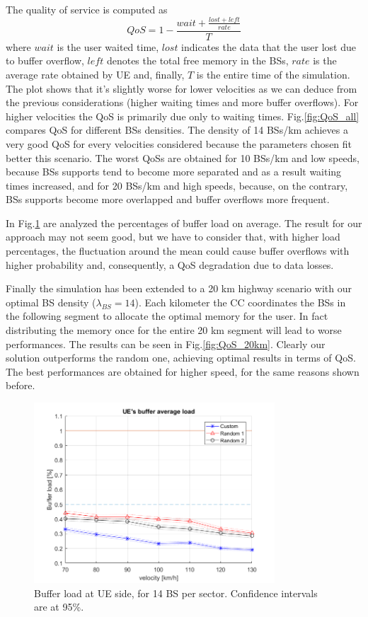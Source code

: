 \documentclass[conference,10pt]{IEEEtran}
\begin{document}
The quality of service is computed as
\begin{equation}
QoS = 1-\frac{wait+\frac{lost+left}{rate}}{T}
\end{equation} 
where $wait$ is the user waited time, $lost$ indicates the data that the user lost due to buffer overflow, $left$ denotes the total free memory in the BSs, $rate$ is the average rate obtained by UE and, finally, $T$ is the entire time of the simulation. The plot shows that it's slightly worse for lower velocities as we can deduce from the previous considerations (higher waiting times and more buffer overflows). For higher velocities the QoS is primarily due only to waiting times. Fig.\ref{fig:QoS_all} compares QoS for different BSs densities. The density of 14 BSs/km achieves a very good QoS for every velocities considered because the parameters chosen fit better this scenario. The worst QoSs are obtained for 10 BSs/km and low speeds, because BSs supports tend to become more separated and as a result waiting times increased, and for 20 BSs/km and high speeds, because, on the contrary, BSs supports become more overlapped and buffer overflows more frequent. 

In Fig.\ref{fig:7BS_buffer_load} are analyzed the percentages of buffer load on average. The result for our approach may not seem good, but we have to consider that, with higher load percentages, the fluctuation around the mean could cause buffer overflows with higher probability and, consequently, a QoS degradation due to data losses.

Finally the simulation has been extended to a 20 km highway scenario with our optimal BS density ($\lambda_{BS}=14$). Each kilometer the CC coordinates the BSs in the following segment to allocate the optimal memory for the user. In fact distributing the memory once for the entire 20 km segment will lead to worse performances. The results can be seen in Fig.\ref{fig:QoS_20km}. Clearly our solution outperforms the random one, achieving optimal results in terms of QoS. The best performances are obtained for higher speed, for the same reasons shown before.







\begin{figure}[t]
	\centering
	\includegraphics[width=9cm]{UE_buffer.png}
	\caption{Buffer load at UE side, for 14 BS per sector. Confidence intervals are at 95\%.}
	\label{fig:7BS_buffer_load}
\end{figure}
\end{document}
